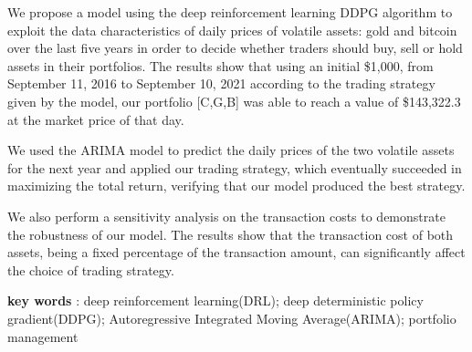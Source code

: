 \documentclass[13pt]{ctexart}
\begin{document}
\begin{adjustwidth}{1cm}{1cm}
\indent { }{ }{ }{ }{ }{}

We propose a model using the deep reinforcement learning DDPG\cite{2019} algorithm to exploit the data characteristics of daily prices of volatile assets: gold and bitcoin over the last five years in order to decide whether traders should buy, sell or hold assets in their portfolios. The results show that using an initial \$1,000, from September 11, 2016 to September 10, 2021 according to the trading strategy given by the model, our portfolio [C,G,B] was able to reach a value of \$143,322.3 at the market price of that day.

We used the ARIMA model to predict the daily prices of the two volatile assets for the next year and applied our trading strategy, which eventually succeeded in maximizing the total return, verifying that our model produced the best strategy.

We also perform a sensitivity analysis on the transaction costs to demonstrate the robustness of our model. The results show that the transaction cost of both assets, being a fixed percentage of the transaction amount, can significantly affect the choice of trading strategy.


\vspace{15pt}
\textbf{key words} : deep reinforcement learning(DRL); deep deterministic policy gradient(DDPG); Autoregressive Integrated Moving Average(ARIMA); portfolio management
\end{adjustwidth} 
\end{document}
